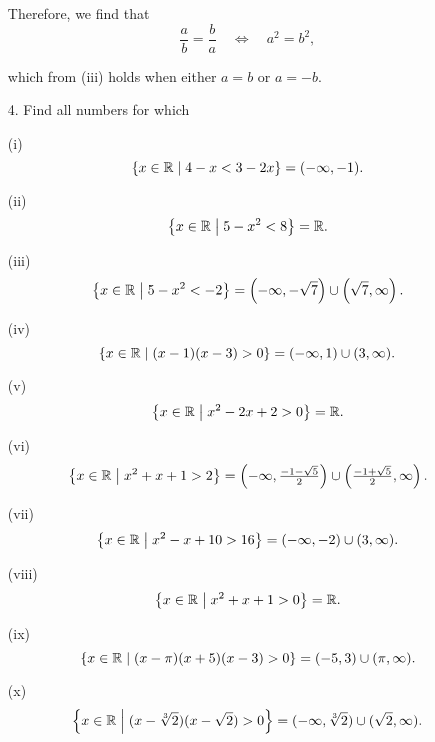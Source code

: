 \documentclass[11pt]{article}
\begin{document}
\begin{enumerate}
          Therefore, we find that
          \[
              \frac{a}{b} = \frac{b}{a} \quad \iff \quad a^2 = b^2,
          \]

          which from (iii) holds when either $a = b$ or $a = -b$.

    \item[4.] Find all numbers for which

    \item[(i)]
          \[
              \left\{  x \in \mathbb{R}  \;\middle|\;  4 - x < 3 - 2x \right\} = (-\infty, -1).
          \]

    \item[(ii)]
          \[
              \left\{  x \in \mathbb{R}  \;\middle|\;  5 - x^2 < 8 \right\} = \mathbb{R}.
          \]

    \item[(iii)]
          \[
              \left\{  x \in \mathbb{R}  \;\middle|\;  5 - x^2 < -2  \right\}
              =
              \left( -\infty, -\sqrt{7} \right)
              \cup
              \left( \sqrt{7}, \infty \right).
          \]

    \item[(iv)]
          \[
              \left\{  x \in \mathbb{R}  \;\middle|\;  (x - 1)(x - 3) > 0  \right\} = (-\infty, 1) \cup (3, \infty).
          \]

    \item[(v)]
          \[
              \left\{  x \in \mathbb{R}  \;\middle|\;  x^2 - 2x + 2 > 0  \right\} = \mathbb{R}.
          \]

    \item[(vi)]
          \[
              \left\{  x \in \mathbb{R}  \;\middle|\;  x^2 + x + 1 > 2  \right\} =
              \left(-\infty, \tfrac{-1 - \sqrt{5}}{2}\right)
              \cup
              \left(\tfrac{-1 + \sqrt{5}}{2}, \infty\right).
          \]


    \item[(vii)]
          \[
              \left\{  x \in \mathbb{R}  \;\middle|\;  x^2 - x + 10 > 16  \right\}
              = (-\infty, -2) \cup (3, \infty).
          \]

    \item[(viii)]
          \[
              \left\{  x \in \mathbb{R}  \;\middle|\;  x^2 + x + 1 > 0  \right\} = \mathbb{R}.
          \]

    \item[(ix)]
          \[
              \left\{  x \in \mathbb{R}  \;\middle|\;  (x - \pi)(x + 5)(x - 3) > 0  \right\}
              = (-5, 3) \cup (\pi, \infty).
          \]

    \item[(x)]
          \[
              \left\{  x \in \mathbb{R}  \;\middle|\;  (x - \sqrt[3]{2})(x - \sqrt{2}) > 0  \right\}
              = (-\infty, \sqrt[3]{2}) \cup (\sqrt{2}, \infty).
          \]


\end{enumerate}
\end{document}
